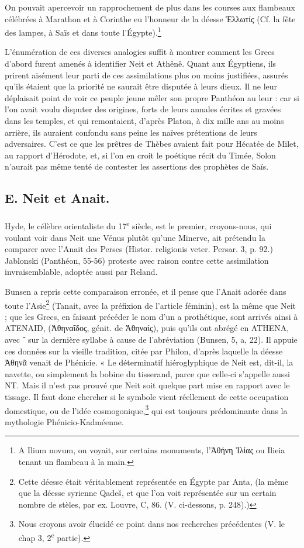 \documentclass[a4paper, 11pt, oneside]{article}
\begin{document}
On pouvait apercevoir un rapprochement de plus dans les courses aux flambeaux célébrées à Marathon et à Corinthe eu l'honneur de la déesse Ἑλλωτίς (Cf. la fête des lampes, à Saïs et dans toute l'Égypte).\footnote{A Ilium novum, on voyait, sur certains monuments, l'Ἀθήνη Ἰλίας ou Ilieia tenant un flambeau à la main.}

L'énumération de ces diverses analogies suffit à montrer comment les Grecs d'abord furent amenés à identifier Neit et Athênê. Quant aux Égyptiens, ils prirent aisément leur parti de ces assimilations plus ou moins justifiées, assurés qu'ils étaient que la priorité ne saurait être disputée à leurs dieux. Il ne leur déplaisait point de voir ce peuple jeune mêler son propre Panthéon au leur : car si l'on avait voulu disputer des origines, forts de leurs annales écrites et gravées dans les temples, et qui remontaient, d'après Platon, à dix mille ans au moins arrière, ils auraient confondu sans peine les naïves prétentions de leurs adversaires. C'est ce que les prêtres de Thèbes avaient fait pour Hécatée de Milet, au rapport d'Hérodote, et, si l'on en croit le poétique récit du Timée, Solon n'aurait pas même tenté de contester les assertions des prophètes de Saïs.
\clearpage
\subsection{E. Neit et Anait.}
\paragraph{}
Hyde, le célèbre orientaliste du 17\textsuperscript{e} siècle, est le premier, croyons-nous, qui voulant voir dans Neit une Vénus plutôt qu'une Minerve, ait prétendu la comparer avec l'Anait des Perses (Histor. religionis veter. Persar. 3, p. 92.) Jablonski (Panthéon, 55-56) proteste avec raison contre cette assimilation invraisemblable, adoptée aussi par Reland.

Bunsen a repris cette comparaison erronée, et il pense que l'Anait adorée dans toute l'Asie\footnote{Cette déesse était véritablement représentée en Égypte par Anta, (la même que la déesse syrienne Qadeš, et que l'on voit représentée sur un certain nombre de stèles, par ex. Louvre, C, 86. (V. ci-dessons, p. 248).)} (Tanait, avec la préfixion de l'article féminin), est la même que Neit ; que les Grecs, en faisant précéder le nom d'un a prothétique, sont arrivés ainsi à ATENAID, (Ἀθηναΐδος, génit. de Ἀθηναίς), puis qu'ils ont abrégé en ATHENA, avec ῀ sur la dernière syllabe à cause de l'abréviation (Bunsen, 5, a, 22). Il appuie ces données sur la vieille tradition, citée par Philon, d'après laquelle la déesse Ἀθηνᾶ venait de Phénicie. « Le déterminatif hiéroglyphique de Neit est, dit-il, la navette, ou simplement la bobine du tisserand, parce que celle-ci s'appelle aussi NT. Mais il n'est pas prouvé que Neit soit quelque part mise en rapport avec le tissage. Il faut donc chercher si le symbole vient réellement de cette occupation domestique, ou de l'idée cosmogonique,\footnote{Nous croyons avoir élucidé ce point dans nos recherches précédentes (V. le chap 3, 2\textsuperscript{e} partie).} qui est toujours prédominante dans la mythologie Phénicio-Kadméenne.
\end{document}
